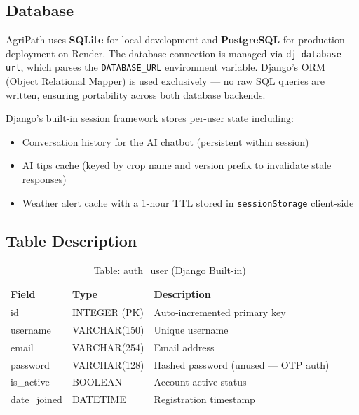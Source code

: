 \documentclass[12pt,a4paper]{article}
\begin{document}
\subsection{Database}

AgriPath uses \textbf{SQLite} for local development and \textbf{PostgreSQL} for production deployment on Render. The database connection is managed via \texttt{dj-database-url}, which parses the \texttt{DATABASE\_URL} environment variable. Django's ORM (Object Relational Mapper) is used exclusively --- no raw SQL queries are written, ensuring portability across both database backends.

Django's built-in session framework stores per-user state including:
\begin{itemize}
    \item Conversation history for the AI chatbot (persistent within session)
    \item AI tips cache (keyed by crop name and version prefix to invalidate stale responses)
    \item Weather alert cache with a 1-hour TTL stored in \texttt{sessionStorage} client-side
\end{itemize}

\subsection{Table Description}

\begin{table}[h]
\caption{Table: auth\_user (Django Built-in)}
\centering
\begin{tabular}{|l|l|p{6cm}|}
\hline
\textbf{Field} & \textbf{Type} & \textbf{Description} \\ \hline
id & INTEGER (PK) & Auto-incremented primary key \\ \hline
username & VARCHAR(150) & Unique username \\ \hline
email & VARCHAR(254) & Email address \\ \hline
password & VARCHAR(128) & Hashed password (unused --- OTP auth) \\ \hline
is\_active & BOOLEAN & Account active status \\ \hline
date\_joined & DATETIME & Registration timestamp \\ \hline
\end{tabular}
\end{table}
\end{document}
